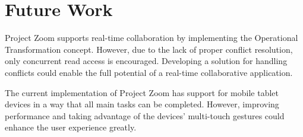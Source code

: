 \section{Future Work}
Project Zoom supports real-time collaboration by implementing the Operational Transformation concept.  However, due to the lack of proper conflict resolution, only concurrent read access is encouraged. Developing a solution for handling conflicts could enable the full potential of a real-time collaborative application.

The current implementation of Project Zoom has support for mobile tablet devices in a way that all main tasks can be completed. However, improving performance and taking advantage of the devices' multi-touch gestures could enhance the user experience greatly.


